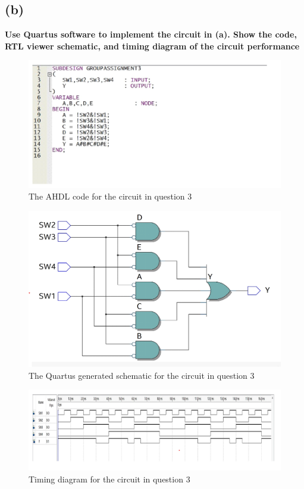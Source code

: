 \documentclass[a4paper,12]{article}
\begin{document}
\subsection*{(b)} \textbf{Use Quartus software to implement the circuit in (a). Show the code, RTL
viewer schematic, and timing diagram of the circuit performance}

\begin{figure}[H]
    \centering
    \includegraphics[width=\linewidth]{q3code.png}
    \caption{ The AHDL code for the circuit in question 3}
    \label{fig:q3code}    
\end{figure}
\begin{figure}[H]
    \centering
    \includegraphics[width=\linewidth]{q3schem.png}
    \caption{ The Quartus generated schematic for the circuit in question 3}
    \label{fig:q3schem}    
\end{figure}
\begin{figure}[H]
    \centering
    \includegraphics[width=\linewidth]{q3timi.png}
    \caption{  Timing diagram for the circuit in question 3}
    \label{fig:q3timi}    
\end{figure}
\end{document}
